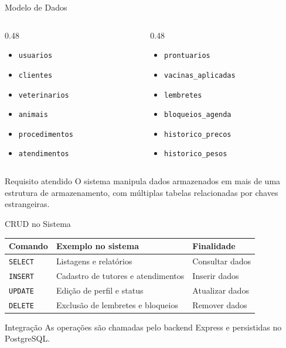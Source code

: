 \documentclass[aspectratio=169,11pt]{beamer}
\begin{document}
\begin{frame}{Modelo de Dados}
  \begin{columns}[T]
    \begin{column}{0.48\textwidth}
      \begin{itemize}
        \item \texttt{usuarios}
        \item \texttt{clientes}
        \item \texttt{veterinarios}
        \item \texttt{animais}
        \item \texttt{procedimentos}
        \item \texttt{atendimentos}
      \end{itemize}
    \end{column}
    \begin{column}{0.48\textwidth}
      \begin{itemize}
        \item \texttt{prontuarios}
        \item \texttt{vacinas\_aplicadas}
        \item \texttt{lembretes}
        \item \texttt{bloqueios\_agenda}
        \item \texttt{historico\_precos}
        \item \texttt{historico\_pesos}
      \end{itemize}
    \end{column}
  \end{columns}

  \begin{block}{Requisito atendido}
    O sistema manipula dados armazenados em mais de uma estrutura de armazenamento, com múltiplas tabelas relacionadas por chaves estrangeiras.
  \end{block}
\end{frame}

\begin{frame}{CRUD no Sistema}
  \begin{table}
    \centering
    \begin{tabular}{lll}
      \toprule
      Comando & Exemplo no sistema & Finalidade \\
      \midrule
      \texttt{SELECT} & Listagens e relatórios & Consultar dados \\
      \texttt{INSERT} & Cadastro de tutores e atendimentos & Inserir dados \\
      \texttt{UPDATE} & Edição de perfil e status & Atualizar dados \\
      \texttt{DELETE} & Exclusão de lembretes e bloqueios & Remover dados \\
      \bottomrule
    \end{tabular}
  \end{table}

  \begin{block}{Integração}
    As operações são chamadas pelo backend Express e persistidas no PostgreSQL.
  \end{block}
\end{frame}
\end{document}
